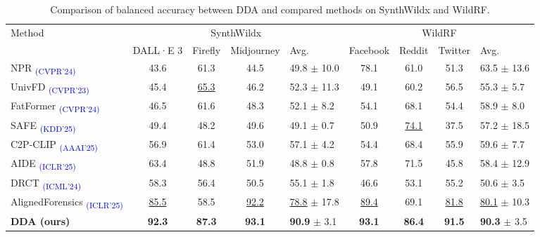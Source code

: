 \documentclass{article}
\begin{document}
\begin{table}[tb!]
\centering
\caption{Comparison of balanced accuracy between DDA and compared methods on SynthWildx and WildRF.}
\label{tab:compare-synthwildx-wildrf}
\begin{adjustbox}{width=\linewidth}
      \begin{tabular}{l|cccl|cccl}
      \toprule
      \multirow{2}{*}{Method} & \multicolumn{4}{c|}{SynthWildx} & \multicolumn{4}{c}{WildRF} \\
      \cmidrule{2-9}
 & DALL·E 3 & Firefly & Midjourney & Avg. & Facebook & Reddit & Twitter & Avg. \\
      \midrule
NPR \textsubscript{\textcolor{blue}{(CVPR'24)}} \cite{cozzolino2024zero} & 43.6 & 61.3 & 44.5 & 49.8 $\pm$ 10.0 & 78.1 & 61.0 & 51.3 & 63.5 $\pm$ 13.6 \\
UnivFD \textsubscript{\textcolor{blue}{(CVPR'23)}} \cite{ojha2023towards} & 45.4 & \underline{65.3} & 46.2 & 52.3 $\pm$ 11.3 & 49.1 & 60.2 & 56.5 & 55.3 $\pm$ 5.7 \\
FatFormer \textsubscript{\textcolor{blue}{(CVPR'24)}} \cite{liu2024forgery} & 46.5 & 61.6 & 48.3 & 52.1 $\pm$ 8.2 & 54.1 & 68.1 & 54.4 & 58.9 $\pm$ 8.0 \\
SAFE \textsubscript{\textcolor{blue}{(KDD'25)}} \cite{li2024improving} & 49.4 & 48.2 & 49.6 & 49.1 $\pm$ 0.7 & 50.9 & \underline{74.1} & 37.5 & 57.2 $\pm$ 18.5 \\
C2P-CLIP \textsubscript{\textcolor{blue}{(AAAI'25)}} \cite{tan2024c2p} & 56.9 & 61.4 & 53.0 & 57.1 $\pm$ 4.2 & 54.4 & 68.4 & 55.9 & 59.6 $\pm$ 7.7  \\
AIDE \textsubscript{\textcolor{blue}{(ICLR'25)}} \cite{yan2024sanity} & 63.4 & 48.8 & 51.9 & 48.8 $\pm$ 0.8 & 57.8 & 71.5 & 45.8 & 58.4 $\pm$ 12.9  \\
DRCT \textsubscript{\textcolor{blue}{(ICML'24)}} \cite{chen2024drct} & 58.3 & 56.4 & 50.5 & 55.1 $\pm$ 1.8 & 46.6 & 53.1 & 55.2 & 50.6 $\pm$ 3.5  \\
AlignedForensics \textsubscript{\textcolor{blue}{(ICLR'25)}} \cite{rajan2025aligned} & \underline{85.5} & 58.5 & \underline{92.2} & \underline{78.8} $\pm$ 17.8 & \underline{89.4} & 69.1 & \underline{81.8} & \underline{80.1} $\pm$ 10.3 \\
\midrule
\rowcolor{myblue}
\textbf{DDA (ours)} & \textbf{92.3} & \textbf{87.3} & \textbf{93.1} & \textbf{90.9} $\pm$ 3.1 & \textbf{93.1} & \textbf{86.4} & \textbf{91.5} & \textbf{90.3} $\pm$ 3.5 \\
\bottomrule
      \end{tabular}
    \end{adjustbox}
      \vspace{0pt}
\end{table}
\end{document}

